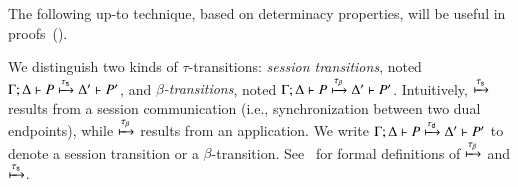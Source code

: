 \documentclass[preprint,11pt]{elsarticle}
\newtheorem{definition}{Definition}[section]
\begin{document}
{%
%


The following up-to technique, based on determinacy properties, will be useful in proofs~().

 
 \begin{notation}
 \label{not:dettrans}
We distinguish two kinds of  $\tau$-transitions:
\emph{session transitions}, noted 
$\Gamma; \Delta \vdash P \xmapsto{\tau_{\mathsf{s}}} \Delta' \vdash P'$,
and 
\emph{$\beta$-transitions}, noted $\Gamma; \Delta \vdash P \xmapsto{\tau_{\beta}} \Delta' \vdash P'$.
Intuitively, $\xmapsto{\tau_{\mathsf{s}}}$  results from a session communication (i.e., synchronization between
two dual endpoints), while 
  $\xmapsto{\tau_{\beta}}$ results from an application. 
 We write  $\Gamma; \Delta \vdash P \xmapsto{\tau_{\mathsf{d}}} \Delta' \vdash P'$ to denote
	 a session transition or a $\beta$-transition.
	See~\cite{KouzapasPY17} for formal definitions of $\xmapsto{\tau_{\beta}}$  and $\xmapsto{\tau_{\mathsf{s}}}$. %
 \end{notation}
 
}
\end{document}
